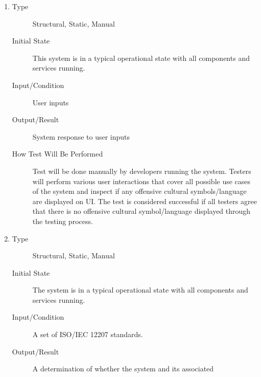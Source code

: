 \documentclass[12pt, titlepage]{article}
\begin{document}
\begin{enumerate}[NFR-T1]
\item \label{NFRT27}
  \begin{description}
  \item[Type] Structural, Static, Manual
  \item[Initial State] This system is in a typical operational state with all
    components and services running.
  \item[Input/Condition] User inputs
  \item[Output/Result] System response to user inputs
  \item[How Test Will Be Performed] Test will be done manually by developers
    running the system. Testers will perform various user interactions that
    cover all possible use cases of the system and inspect if any offensive
    cultural symbols/language are displayed on UI. The test is considered
    successful if all testers agree that there is no offensive cultural
    symbol/language displayed through the testing process.
  \end{description}
\item \label{NFRT28}
  \begin{description}
  \item[Type] Structural, Static, Manual
  \item[Initial State] The system is in a typical operational state with all
    components and services running.
  \item[Input/Condition] A set of ISO/IEC 12207 standards.
  \item[Output/Result] A determination of whether the system and its associated

\end{description}
\end{enumerate}
\end{document}
